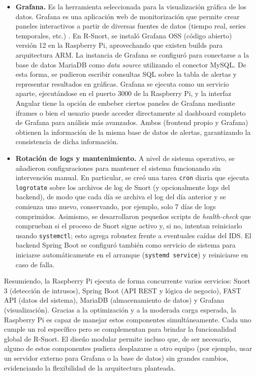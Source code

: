 \documentclass[11pt,a4paper,twoside]{report}
\begin{document}
\begin{itemize}
	\item \textbf{Grafana.} Es la herramienta seleccionada para la visualización gráfica de los datos. Grafana es una aplicación web de monitorización que permite crear paneles interactivos a partir de diversas fuentes de datos (tiempo real, series temporales, etc.) \cite{Grafana}. En R-Snort, se instaló Grafana OSS (código abierto) versión 12 en la Raspberry Pi, aprovechando que existen builds para arquitectura ARM. La instancia de Grafana se configuró para conectarse a la base de datos MariaDB como \emph{data source} utilizando el conector MySQL. De esta forma, se pudieron escribir consultas SQL sobre la tabla de alertas y representar resultados en gráficas. Grafana se ejecuta como un servicio aparte, ejecutándose en el puerto 3000 de la Raspberry Pi, y la interfaz Angular tiene la opción de embeber ciertos paneles de Grafana mediante iframes o bien el usuario puede acceder directamente al dashboard completo de Grafana para análisis más avanzados. Ambos (frontend propio y Grafana) obtienen la información de la misma base de datos de alertas, garantizando la consistencia de dicha información.
	
	\item \textbf{Rotación de logs y mantenimiento.} A nivel de sistema operativo, se añadieron configuraciones para mantener el sistema funcionando sin intervención manual. En particular, se creó una tarea \texttt{cron} diaria que ejecuta \texttt{logrotate} sobre los archivos de log de Snort (y opcionalmente logs del backend), de modo que cada día se archiva el log del día anterior y se comienza uno nuevo, conservando, por ejemplo, solo 7 días de logs comprimidos. Asimismo, se desarrollaron pequeños scripts de \emph{health-check} que comprueban si el proceso de Snort sigue activo y, si no, intentan reiniciarlo usando \texttt{systemctl}; esto agrega robustez frente a eventuales caídas del IDS. El backend Spring Boot se configuró también como servicio de sistema para iniciarse automáticamente en el arranque (\texttt{systemd service}) y reiniciarse en caso de falla.
\end{itemize}


Resumiendo, la Raspberry Pi ejecuta de forma concurrente varios servicios: Snort 3 (detección de intrusos), Spring Boot (API REST y lógica de negocio), FAST API (datos del sistema), MariaDB (almacenamiento de datos) y Grafana (visualización). Gracias a la optimización y a la moderada carga esperada, la Raspberry Pi es capaz de manejar estos componentes simultáneamente. Cada uno cumple un rol específico pero se complementan para brindar la funcionalidad global de R-Snort. El diseño modular permite incluso que, de ser necesario, alguno de estos componentes pudiera desplazarse a otro equipo (por ejemplo, usar un servidor externo para Grafana o la base de datos) sin grandes cambios, evidenciando la flexibilidad de la arquitectura planteada.
\end{document}
